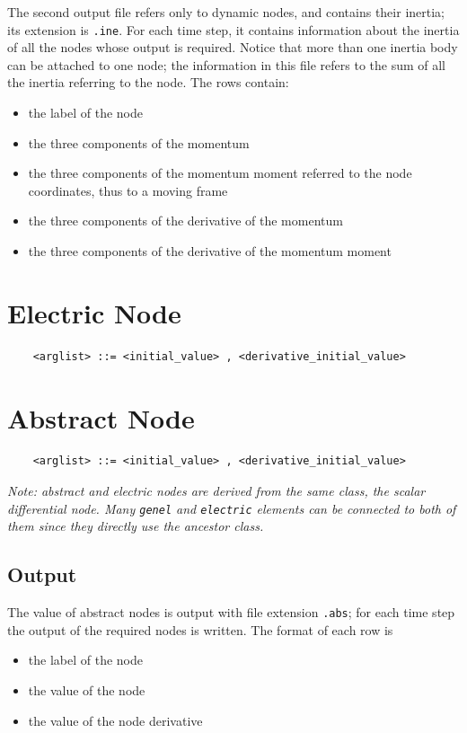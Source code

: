 \documentclass[10pt,dvips]{report}
\begin{document}
\noindent
The second output file refers only to dynamic nodes, and contains their
inertia; its extension is {\tt .ine}.
For each time step, it contains information about the inertia of all the
nodes whose output is required.
Notice that more than one inertia body can be attached to one node; the
information in this file refers to the sum of all the inertia referring to
the node.
The rows contain:
\begin{itemize}
    \item the label of the node
    \item the three components of the momentum
    \item the three components of the momentum moment referred to the node
    coordinates, thus to a moving frame
    \item the three components of the derivative of the momentum
    \item the three components of the derivative of the momentum moment
\end{itemize}


\section{Electric Node}
\begin{verbatim}
    <arglist> ::= <initial_value> , <derivative_initial_value>
\end{verbatim}




\section{Abstract Node}
\begin{verbatim}
    <arglist> ::= <initial_value> , <derivative_initial_value>
\end{verbatim}
{\em
    Note: abstract and electric nodes are derived from the same class, the
    scalar differential node. Many {\tt genel} and {\tt electric} elements 
    can be connected to both of them since they directly use the ancestor
    class. 
}

\subsection{Output}
The value of abstract nodes is output with file extension {\tt .abs}; for
each time step the output of the required nodes is written.
The format of each row is
\begin{itemize}
    \item the label of the node
    \item the value of the node
    \item the value of the node derivative
\end{itemize}
\end{document}

